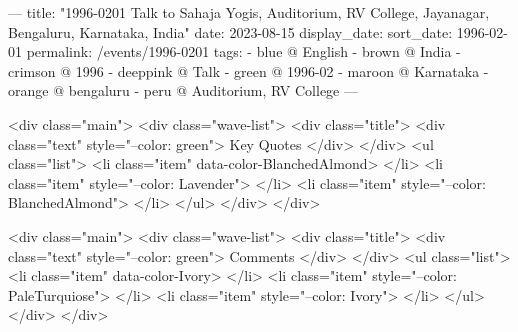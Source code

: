 ---
title: "1996-0201 Talk to Sahaja Yogis, Auditorium, RV College, Jayanagar, Bengaluru, Karnataka, India"
date: 2023-08-15
display_date: 
sort_date: 1996-02-01
permalink: /events/1996-0201
tags:
  - blue @ English
  - brown @ India
  - crimson @ 1996
  - deeppink @ Talk
  - green @ 1996-02
  - maroon @ Karnataka
  - orange @ bengaluru
  - peru @ Auditorium, RV College
---

<div class="main">
  <div class="wave-list">
    <div class="title">
      <div class="text" style="--color: green">
        Key Quotes
      </div>
    </div>
    <ul class="list">
        <li class="item" data-color-BlanchedAlmond>
        </li>
        <li class="item" style="--color: Lavender">
        </li>
        <li class="item" style="--color: BlanchedAlmond">
        </li>
      </ul>
  </div>
</div>

<div class="main">
  <div class="wave-list">
    <div class="title">
      <div class="text" style="--color: green">
        Comments
      </div>
    </div>
    <ul class="list">
        <li class="item" data-color-Ivory>
        </li>
        <li class="item" style="--color: PaleTurquiose">
        </li>
        <li class="item" style="--color: Ivory">
        </li>
      </ul>
  </div>
</div>